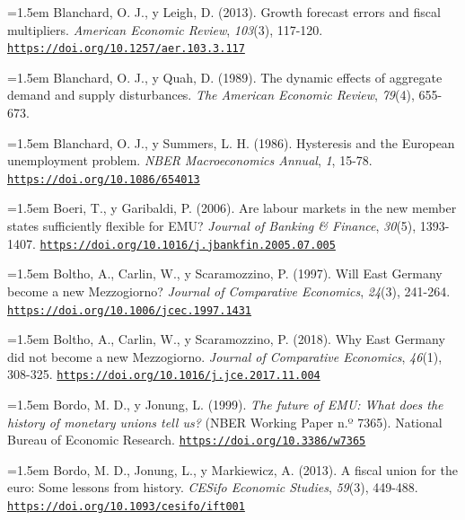 \documentclass[10pt,a4paper]{article}
\begin{document}
\noindent\hangindent=1.5em Blanchard, O. J., y Leigh, D. (2013). Growth forecast errors and fiscal multipliers. \textit{American Economic Review}, \textit{103}(3), 117-120. \href{https://doi.org/10.1257/aer.103.3.117}{\nolinkurl{https://doi.org/10.1257/aer.103.3.117}}

\noindent\hangindent=1.5em Blanchard, O. J., y Quah, D. (1989). The dynamic effects of aggregate demand and supply disturbances. \textit{The American Economic Review}, \textit{79}(4), 655-673.

\noindent\hangindent=1.5em Blanchard, O. J., y Summers, L. H. (1986). Hysteresis and the European unemployment problem. \textit{NBER Macroeconomics Annual}, \textit{1}, 15-78. \href{https://doi.org/10.1086/654013}{\nolinkurl{https://doi.org/10.1086/654013}}

\noindent\hangindent=1.5em Boeri, T., y Garibaldi, P. (2006). Are labour markets in the new member states sufficiently flexible for EMU? \textit{Journal of Banking \& Finance}, \textit{30}(5), 1393-1407. \href{https://doi.org/10.1016/j.jbankfin.2005.07.005}{\nolinkurl{https://doi.org/10.1016/j.jbankfin.2005.07.005}}

\noindent\hangindent=1.5em Boltho, A., Carlin, W., y Scaramozzino, P. (1997). Will East Germany become a new Mezzogiorno? \textit{Journal of Comparative Economics}, \textit{24}(3), 241-264. \href{https://doi.org/10.1006/jcec.1997.1431}{\nolinkurl{https://doi.org/10.1006/jcec.1997.1431}}

\noindent\hangindent=1.5em Boltho, A., Carlin, W., y Scaramozzino, P. (2018). Why East Germany did not become a new Mezzogiorno. \textit{Journal of Comparative Economics}, \textit{46}(1), 308-325. \href{https://doi.org/10.1016/j.jce.2017.11.004}{\nolinkurl{https://doi.org/10.1016/j.jce.2017.11.004}}

\noindent\hangindent=1.5em Bordo, M. D., y Jonung, L. (1999). \textit{The future of EMU: What does the history of monetary unions tell us?} (NBER Working Paper n.º 7365). National Bureau of Economic Research. \href{https://doi.org/10.3386/w7365}{\nolinkurl{https://doi.org/10.3386/w7365}}

\noindent\hangindent=1.5em Bordo, M. D., Jonung, L., y Markiewicz, A. (2013). A fiscal union for the euro: Some lessons from history. \textit{CESifo Economic Studies}, \textit{59}(3), 449-488. \href{https://doi.org/10.1093/cesifo/ift001}{\nolinkurl{https://doi.org/10.1093/cesifo/ift001}}
\end{document}
